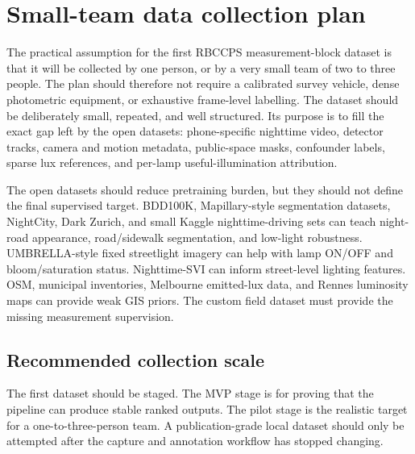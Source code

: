 \documentclass[11pt]{article}
\begin{document}
\section{Small-team data collection plan}

The practical assumption for the first RBCCPS measurement-block dataset is that it will be collected by one person, or by a very small team of two to three people. The plan should therefore not require a calibrated survey vehicle, dense photometric equipment, or exhaustive frame-level labelling. The dataset should be deliberately small, repeated, and well structured. Its purpose is to fill the exact gap left by the open datasets: phone-specific nighttime video, detector tracks, camera and motion metadata, public-space masks, confounder labels, sparse lux references, and per-lamp useful-illumination attribution.

The open datasets should reduce pretraining burden, but they should not define the final supervised target. BDD100K, Mapillary-style segmentation datasets, NightCity, Dark Zurich, and small Kaggle nighttime-driving sets can teach night-road appearance, road/sidewalk segmentation, and low-light robustness. UMBRELLA-style fixed streetlight imagery can help with lamp ON/OFF and bloom/saturation status. Nighttime-SVI can inform street-level lighting features. OSM, municipal inventories, Melbourne emitted-lux data, and Rennes luminosity maps can provide weak GIS priors. The custom field dataset must provide the missing measurement supervision.

\subsection{Recommended collection scale}

The first dataset should be staged. The MVP stage is for proving that the pipeline can produce stable ranked outputs. The pilot stage is the realistic target for a one-to-three-person team. A publication-grade local dataset should only be attempted after the capture and annotation workflow has stopped changing.
\end{document}
